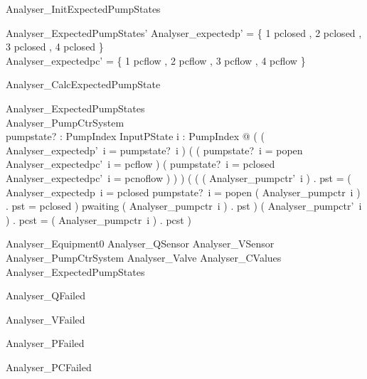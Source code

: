 \documentclass{article}
\begin{document}
\begin{schema}{Analyser\_InitExpectedPumpStates}

 Analyser\_ExpectedPumpStates' 
\where
 Analyser\_expectedp' = \{ 1 \mapsto pclosed , 2 \mapsto pclosed , 3 \mapsto pclosed , 4 \mapsto pclosed \} \\
 Analyser\_expectedpc' = \{ 1 \mapsto pcflow , 2 \mapsto pcflow , 3 \mapsto pcflow , 4 \mapsto pcflow \}
\end{schema}

\begin{schema}{Analyser\_CalcExpectedPumpState}

 \Delta Analyser\_ExpectedPumpStates \\
 \Delta Analyser\_PumpCtrSystem \\
 pumpstate? : PumpIndex \fun InputPState 
\where
 \forall i : PumpIndex @ ( ( Analyser\_expectedp'~i = pumpstate?~i ) \land ( ( pumpstate?~i = popen \land Analyser\_expectedpc'~i = pcflow ) \lor ( pumpstate?~i = pclosed \land Analyser\_expectedpc'~i = pcnoflow ) ) ) \land ( ( ( Analyser\_pumpctr'~i ) . pst = \IF ( Analyser\_expectedp~i = pclosed \land pumpstate?~i = popen \land ( Analyser\_pumpctr~i ) . pst = pclosed ) \THEN pwaiting \ELSE ( Analyser\_pumpctr~i ) . pst ) \land ( Analyser\_pumpctr'~i ) . pcst = ( Analyser\_pumpctr~i ) . pcst )
\end{schema}

\begin{zed}
	Analyser\_Equipment0  Analyser\_QSensor \land Analyser\_VSensor \land Analyser\_PumpCtrSystem \land Analyser\_Valve \land Analyser\_CValues \land Analyser\_ExpectedPumpStates
\end{zed}

\begin{zed}
	Analyser\_QFailed 
\end{zed}

\begin{zed}
	Analyser\_VFailed 
\end{zed}

\begin{zed}
	Analyser\_PFailed 
\end{zed}

\begin{zed}
	Analyser\_PCFailed 
\end{zed}
\end{document}
